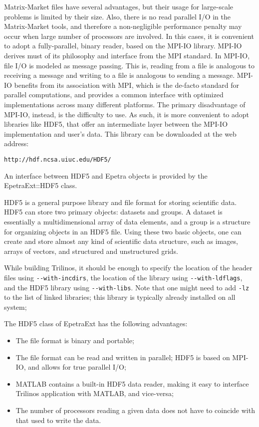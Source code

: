 \documentclass[11pt,relax]{SANDreport}
\begin{document}
Matrix-Market files have several advantages, but their usage for large-scale
problems is limited by their size. Also, there is no read parallel I/O in the
Matrix-Market tools, and therefore a non-negligible performance penalty may
occur when large number of processors are involved. In this cases, it is
convenient to adopt a fully-parallel, binary reader, based on the MPI-IO
library. MPI-IO derives must of its philosophy and interface from the MPI
standard. In MPI-IO, file I/O is modeled as message passing. This is, reading
from a file is analogous to receiving a message and writing to a file is
analogous to sending a message. MPI-IO benefits from its association with MPI,
which is the de-facto standard for parallel computations, and provides a
common interface with optimized implementations across many different
platforms. The primary disadvantage of MPI-IO, instead, is the difficulty to
use. As such, it is more convenient to adopt libraries like HDF5, that offer
an intermediate layer between the MPI-IO implementation and user's data. This
library can be downloaded  at the web address:
\begin{verbatim}
http://hdf.ncsa.uiuc.edu/HDF5/
\end{verbatim}
An interface between HDF5 and Epetra objects is provided by the
EpetraExt::HDF5 class.

HDF5 is a general purpose library and file format for storing scientific data.
HDF5 can store two primary objects: datasets and groups. A dataset is
essentially a multidimensional array of data elements, and a group is a
structure for organizing objects in an HDF5 file. Using these two basic
objects, one can create and store almost any kind of scientific data
structure, such as images, arrays of vectors, and structured and unstructured
grids. 

While building Trilinos, it should be enough to specify the location of the
header files using \verb!--with-incdirs!, the location of the library using
\verb!--with-ldflags!, and the HDF5 library using \verb!--with-libs!. Note
that one might need to add \verb!-lz! to the list of linked libraries; this library
is typically already installed on all system;

The HDF5 class of EpetraExt has the following advantages:
\begin{itemize}
\item The file format is binary and portable;
\item The file format can be read and written in parallel;
HDF5 is based on MPI-IO, and allows for true parallel I/O;
\item MATLAB contains a built-in HDF5 data reader, making it easy to interface
Trilinos application with MATLAB, and vice-versa;
\item The number of processors reading a given
data does not have to coincide with that used to write the data.
\end{itemize}
\end{document}

